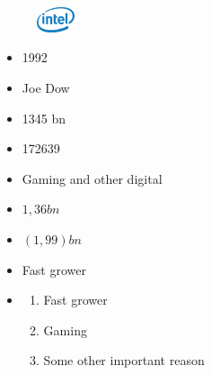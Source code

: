 \documentclass[11pt]{scrartcl}
\begin{document}



\begin{figure}[h!]
    \includegraphics[width=3em]{company_logo.png}
    \label{fig:company_logo}
\end{figure}



\begin{itemize}
    \item [\faAsterisk] 1992
    \item [\faMale] Joe Dow
    \item [\faEuro] \num{1345} bn
    \item [\faUsers] \num{172639}
    \item [\faIndustry] Gaming and other digital
    \item [\faBook] \faEuro $1,36 bn$
    \item [\reflectbox{\rotatebox[origin=c]{270}{\faLevelDown}}] \faEuro $(1,99) bn$
    \item [\faFolderOpen]Fast grower
    \item [\faQuestion]
    \begin{enumerate}
        \item Fast grower
        \item Gaming
        \item Some other important reason
    \end{enumerate}

\end{itemize}
\end{document}
